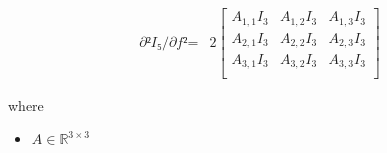 \documentclass[12pt]{article}
\begin{document}
\begin{align*}
\textit{∂²I₅/∂f²} = & 2\begin{bmatrix}
\textit{A}_{1, 1}I_{ 3 } & \textit{A}_{1, 2}I_{ 3 } & \textit{A}_{1, 3}I_{ 3 }\\
\textit{A}_{2, 1}I_{ 3 } & \textit{A}_{2, 2}I_{ 3 } & \textit{A}_{2, 3}I_{ 3 }\\
\textit{A}_{3, 1}I_{ 3 } & \textit{A}_{3, 2}I_{ 3 } & \textit{A}_{3, 3}I_{ 3 }\\
\end{bmatrix}
\end{align*}

where
\begin{itemize}
\item $\textit{A} \in \mathbb{R}^{ 3 \times 3 }$
\end{itemize}
\end{document}
